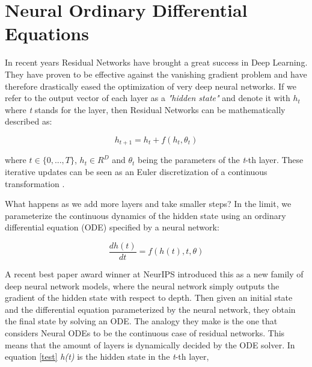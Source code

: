 \chapter{Neural Ordinary Differential Equations}

In recent years Residual Networks \cite{he2016deep} have brought a great success in Deep Learning. They have proven to be effective against the vanishing gradient problem and have therefore drastically eased the optimization of very deep neural networks. If we refer to the output vector of each layer as a \emph{"hidden state"} and denote it with $h_t$ where \emph{t} stands for the layer, then Residual Networks can be mathematically described as:

\begin{displaymath}
    h_{t+1} = h_{t} + f(h_{t}, \theta_{t})
\end{displaymath}

where $ t \in \{0, ..., T\} $, $ h_t \in R^D $ and $ \theta_t $ being the parameters of the \emph{t}-th layer. These iterative updates can be seen as an Euler discretization of a continuous transformation \cite{lu2017beyond}\cite{haber2017stable}\cite{ruthotto2018deep}.

What happens as we add more layers and take smaller steps? In the limit, we parameterize the continuous dynamics of the hidden state using an ordinary differential equation (ODE) specified by a neural network:

\begin{equation}
    \label{test}
    \frac{d h(t)}{d t} = f(h(t), t, \theta )
\end{equation}

A recent best paper award winner at NeurIPS \cite{chen2018neural} introduced this as a new family of deep neural network models, where the neural network simply outputs the gradient of the hidden state with respect to depth. Then given an initial state and the differential equation parameterized by the neural network, they obtain the final state by solving an ODE. The analogy they make is the one that considers Neural ODEs to be the continuous case of residual networks. This means that the amount of layers is dynamically decided by the ODE solver.
In equation \ref{test} \emph{h(t)} is the hidden state in the \emph{t}-th layer, 


